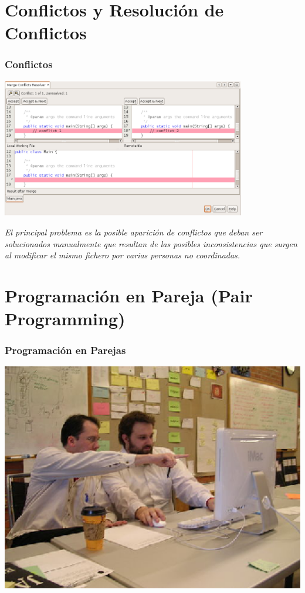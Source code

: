 \documentclass{beamer}
\begin{document}
\section{Conflictos y Resolución de Conflictos}


\begin{frame}
\frametitle{Conflictos}
\begin{center}
\includegraphics[width=0.8\textwidth]{img/conflict-resolver.eps}
\end{center}

{\it 
El principal problema es la posible
aparición de {\color{blue} conflictos} que deban ser solucionados manualmente 
que resultan de
las posibles inconsistencias que surgen al modificar el mismo fichero
por varias personas no coordinadas. 
}
\end{frame}

\section{Programación en Pareja (Pair Programming)}
\begin{frame}
\frametitle{Programación en Parejas}
\includegraphics[width=1.0\textwidth]{img/pair_programming_1.eps}
\end{frame}
\end{document}
